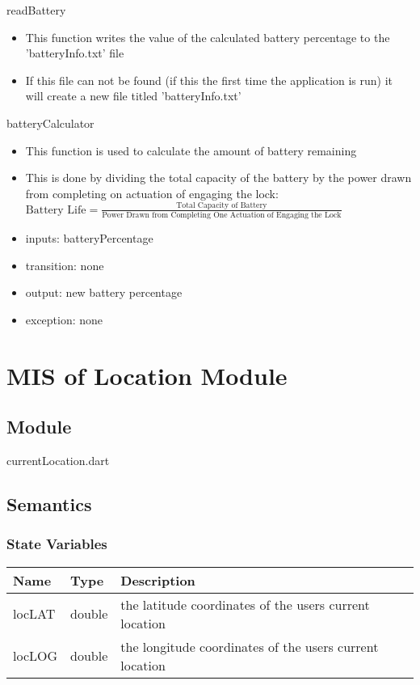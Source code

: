 \documentclass[12pt, titlepage]{article}
\begin{document}
\begin{itemize}
\noindent readBattery
\begin{itemize}
\item This function writes the value of the calculated battery percentage to the 'batteryInfo.txt' file
\item If this file can not be found (if this the first time the application is run) it will create a new file titled 'batteryInfo.txt'
\end{itemize}

\noindent batteryCalculator
\begin{itemize}
\item This function is used to calculate the amount of battery remaining
\item This is done by dividing the total capacity of the battery by the power drawn from completing on actuation of engaging the lock: \newline $\text{Battery Life} = \frac{\text{Total Capacity of Battery}}{\text{Power Drawn from Completing One Actuation of Engaging the Lock}}$
\end{itemize}

\begin{itemize}
\item inputs: batteryPercentage
\item transition: none
\item output: new battery percentage
\item exception: none
\end{itemize}


\section{MIS of Location Module} \label{mHD}

\subsection{Module}
currentLocation.dart

\subsection{Semantics}

\subsubsection{State Variables}

\begin{center}
\begin{tabular}{p{4cm} p{4cm} p{6cm}}
\hline
\textbf{Name} & \textbf{Type} & \textbf{Description} \\
\hline
locLAT & double & the latitude coordinates of the users current location \\
locLOG & double & the longitude coordinates of the users current location \\
\hline
\end{tabular}
\end{center}


\end{itemize}
\end{document}
